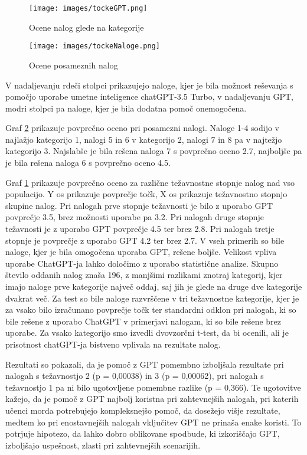 \documentclass[a4paper,12pt,openright]{book}
\begin{document}
\begin{figure}[H]
    \centering
    \texttt{[image: images/tockeGPT.png]}
    \caption{Ocene nalog glede na kategorije}
    \label{fig:bar_all}
\end{figure}

\begin{figure}[H]
    \centering
    \texttt{[image: images/tockeNaloge.png]}
    \caption{Ocene posameznih nalog}
    \label{fig:grade_all}
\end{figure}
 V nadaljevanju rdeči stolpci prikazujejo naloge, kjer je bila možnost reševanja s pomočjo uporabe umetne inteligence chatGPT-3.5 Turbo, v nadaljevanju GPT, modri stolpci pa naloge, kjer je bila dodatna pomoč onemogočena.

Graf \ref{fig:grade_all} prikazuje povprečno oceno pri posamezni nalogi. Naloge 1-4 sodijo v najlažjo kategorijo 1, nalogi 5 in 6 v kategorijo 2, nalogi 7 in 8 pa v najtežjo kategorijo 3. Najslabše je bila rešena naloga 7 s povprečno oceno 2.7, najboljše pa je bila rešena naloga 6 s povprečno oceno 4.5.


Graf \ref{fig:bar_all} prikazuje povprečno oceno za različne težavnostne stopnje nalog nad vso populacijo. Y os prikazuje povprečje točk, X os prikazuje težavnostno stopnjo skupine nalog.
Pri nalogah prve stopnje težavnosti je bilo z uporabo GPT povprečje 3.5, brez možnosti uporabe pa 3.2. Pri nalogah druge stopnje težavnosti je z uporabo GPT povprečje 4.5 ter brez 2.8. Pri nalogah tretje stopnje je povprečje z uporabo GPT 4.2 ter brez 2.7. V vseh primerih so bile naloge, kjer je bila omogočena uporaba GPT, rešene boljše.
Velikost vpliva uporabe ChatGPT-ja lahko določimo z uporabo statistične analize.
Skupno število oddanih nalog znaša 196, z manjšimi razlikami znotraj kategorij, kjer imajo naloge prve kategorije največ oddaj, saj jih je glede na druge dve kategorije dvakrat več. Za test so bile naloge razvrščene v tri težavnostne kategorije, kjer je za vsako bilo izračunano povprečje točk ter standardni odklon pri nalogah, ki so bile rešene z uporabo ChatGPT v primerjavi nalogam, ki so bile rešene brez uporabe. Za vsako kategorijo smo izvedli dvovzorčni t-test, da bi ocenili, ali je prisotnost chatGPT-ja bistveno vplivala na rezultate nalog.

Rezultati so pokazali, da je pomoč z GPT pomembno izboljšala rezultate pri nalogah s težavnostjo 2 (p = 0,00038) in 3 (p = 0,00062), pri nalogah s težavnostjo 1 pa ni bilo ugotovljene pomembne razlike (p = 0,366). Te ugotovitve kažejo, da je pomoč z GPT najbolj koristna pri zahtevnejših nalogah, pri katerih učenci morda potrebujejo kompleksnejšo pomoč, da dosežejo višje rezultate, medtem ko pri enostavnejših nalogah vključitev GPT ne prinaša enake koristi. To potrjuje hipotezo, da lahko dobro oblikovane spodbude, ki izkoriščajo GPT, izboljšajo uspešnost, zlasti pri zahtevnejših scenarijih.
\end{document}
